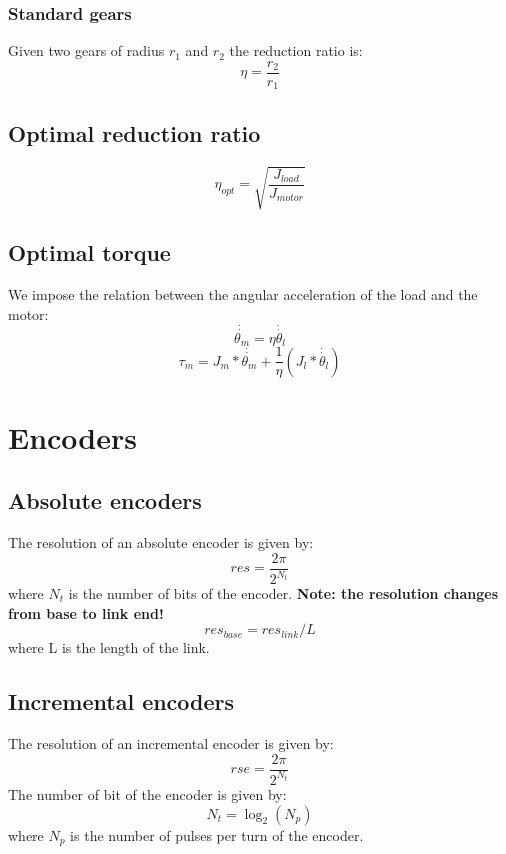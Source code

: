 \documentclass[11pt]{article}
\begin{document}
\subsubsection{Standard gears}
Given two gears of radius $r_1$ and $r_2$ the reduction ratio is:
\begin{equation}
    \eta = \frac{r_2}{r_1}
\end{equation}
\subsection{Optimal reduction ratio}
\begin{equation}
    \eta_{opt} = \sqrt{\frac{J_{load}}{J_{motor}}}
\end{equation}
\subsection{Optimal torque}
We impose the relation between the angular acceleration 
of the load and the motor:
\begin{equation}
    \dot{\dot{\theta_{m}}} = \eta\dot{\dot{\theta_{l}}}
\end{equation}
\begin{equation}
    \tau_{m} = J_{m}*\dot{\dot{\theta_m}} +\frac{1}{\eta}(J_{l}*\dot{\dot{\theta_l}})
\end{equation}
\section{Encoders}\label{sec:encoders}
\subsection{Absolute encoders}
The resolution of an absolute encoder is given by:
\begin{equation}
    res = \frac{2\pi}{2^{N_t}}
\end{equation}
where $N_t$ is the number of bits of the encoder.
\textbf{Note: the resolution changes from base to link end!}
\begin{equation}
    res_{base} = res_{link}/L
\end{equation}
where L is the length of the link.
\subsection{Incremental encoders}
The resolution of an incremental encoder is given by:
\begin{equation}
    rse = \frac{2\pi}{2^{N_t}}
\end{equation}
The number of bit of the encoder is given by:
\begin{equation}
    N_t = \log_2(N_p)
\end{equation}
where $N_p$ is the number of pulses per turn of the encoder.
\end{document}
